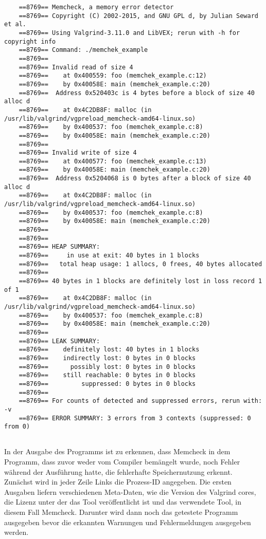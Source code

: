 \begin{lstlisting}
	==8769== Memcheck, a memory error detector
	==8769== Copyright (C) 2002-2015, and GNU GPL d, by Julian Seward et al.
	==8769== Using Valgrind-3.11.0 and LibVEX; rerun with -h for copyright info
	==8769== Command: ./memchek_example
	==8769== 
	==8769== Invalid read of size 4
	==8769==    at 0x400559: foo (memchek_example.c:12)
	==8769==    by 0x40058E: main (memchek_example.c:20)
	==8769==  Address 0x520403c is 4 bytes before a block of size 40 alloc d
	==8769==    at 0x4C2DB8F: malloc (in /usr/lib/valgrind/vgpreload_memcheck-amd64-linux.so)
	==8769==    by 0x400537: foo (memchek_example.c:8)
	==8769==    by 0x40058E: main (memchek_example.c:20)
	==8769== 
	==8769== Invalid write of size 4
	==8769==    at 0x400577: foo (memchek_example.c:13)
	==8769==    by 0x40058E: main (memchek_example.c:20)
	==8769==  Address 0x5204068 is 0 bytes after a block of size 40 alloc d
	==8769==    at 0x4C2DB8F: malloc (in /usr/lib/valgrind/vgpreload_memcheck-amd64-linux.so)
	==8769==    by 0x400537: foo (memchek_example.c:8)
	==8769==    by 0x40058E: main (memchek_example.c:20)
	==8769== 
	==8769== 
	==8769== HEAP SUMMARY:
	==8769==     in use at exit: 40 bytes in 1 blocks
	==8769==   total heap usage: 1 allocs, 0 frees, 40 bytes allocated
	==8769== 
	==8769== 40 bytes in 1 blocks are definitely lost in loss record 1 of 1
	==8769==    at 0x4C2DB8F: malloc (in /usr/lib/valgrind/vgpreload_memcheck-amd64-linux.so)
	==8769==    by 0x400537: foo (memchek_example.c:8)
	==8769==    by 0x40058E: main (memchek_example.c:20)
	==8769== 
	==8769== LEAK SUMMARY:
	==8769==    definitely lost: 40 bytes in 1 blocks
	==8769==    indirectly lost: 0 bytes in 0 blocks
	==8769==      possibly lost: 0 bytes in 0 blocks
	==8769==    still reachable: 0 bytes in 0 blocks
	==8769==         suppressed: 0 bytes in 0 blocks
	==8769== 
	==8769== For counts of detected and suppressed errors, rerun with: -v
	==8769== ERROR SUMMARY: 3 errors from 3 contexts (suppressed: 0 from 0)
	
\end{lstlisting}

In der Ausgabe des Programms ist zu erkennen, dass Memcheck in dem Programm, dass zuvor weder vom Compiler bemängelt wurde, noch Fehler während der Ausführung hatte, die fehlerhafte Speichernutzung erkennt.
Zunächst wird in jeder Zeile Links die Prozess-ID angegeben. Die ersten Ausgaben liefern verschiedenen Meta-Daten, wie die Version des Valgrind cores, die Lizenz unter der das Tool veröffentlicht ist und das verwendete Tool, in diesem Fall Memcheck. Darunter wird dann noch das getestete Programm ausgegeben bevor die erkannten Warnungen und Fehlermeldungen ausgegeben werden. 

